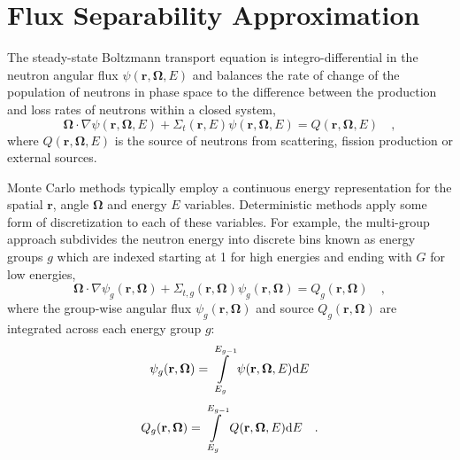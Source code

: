 \section{Flux Separability Approximation}
\label{sec:flux-separability}

The steady-state Boltzmann transport equation is integro-differential in the neutron angular flux $\psi(\mathbf{r},\mathbf{\Omega},E)$ and balances the rate of change of the population of neutrons in phase space to the difference between the production and loss rates of neutrons within a closed system,
%
\begin{dmath}
\label{eqn:transport-eqn-ce}
\mathbf{\Omega} \cdot \nabla \psi(\mathbf{r},\mathbf{\Omega},E) + \Sigma_{t}(\mathbf{r},E)\psi(\mathbf{r},\mathbf{\Omega},E) = Q(\mathbf{r},\mathbf{\Omega},E) \quad ,
\end{dmath}
%
%
where $Q(\mathbf{r},\mathbf{\Omega},E)$ is the source of neutrons from scattering, fission production or external sources.

Monte Carlo methods typically employ a continuous energy representation for the spatial $\mathbf{r}$, angle $\mathbf{\Omega}$ and energy $E$ variables. Deterministic methods apply some form of discretization to each of these variables. For example, the multi-group approach subdivides the neutron energy into discrete bins known as energy groups $g$ which are indexed starting at 1 for high energies and ending with $G$ for low energies,
%
\begin{dmath}
\label{eqn:transport-eqn-mg}
\mathbf{\Omega} \cdot \nabla \psi_{g}(\mathbf{r},\mathbf{\Omega}) + \Sigma_{t,g}(\mathbf{r},\mathbf{\Omega})\psi_{g}(\mathbf{r},\mathbf{\Omega}) = Q_{g}(\mathbf{r},\mathbf{\Omega}) \quad ,
\end{dmath}
%
where the group-wise angular flux $\psi_{g}(\mathbf{r},\mathbf{\Omega})$ and source $Q_{g}(\mathbf{r},\mathbf{\Omega})$ are integrated across each energy group $g$:
%
\begin{dmath}
\label{eqn:groupwise-flux}
\psi_{g}(\mathbf{r},\mathbf{\Omega}) = \int\displaylimits_{E_{g}}^{E_{g-1}} \psi(\mathbf{r},\mathbf{\Omega},E)\mathrm{d}E
\end{dmath}
%
\begin{dmath}
\label{eqn:groupwise-source}
Q_{g}(\mathbf{r},\mathbf{\Omega}) = \int\displaylimits_{E_{g}}^{E_{g-1}} Q(\mathbf{r},\mathbf{\Omega},E)\mathrm{d}E \quad .
\end{dmath}
%

